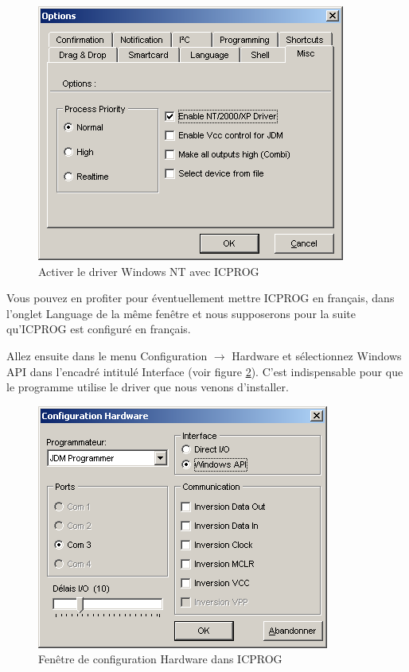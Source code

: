 \documentclass[a4paper]{article}
\begin{document}
\begin{figure}[H]
	\centering
	\includegraphics[scale=0.75]{Images/ICPROG_Enable_NT_Driver.png}
	\caption{Activer le driver Windows NT avec ICPROG
		\label{ICPROG_Enable_NT_Driver}}
\end{figure}

Vous pouvez en profiter pour éventuellement mettre ICPROG en français, dans l'onglet \og{}Language\fg{} de la même fenêtre et nous supposerons pour la suite qu'ICPROG est configuré en français.

Allez ensuite dans le menu \og{}Configuration\fg{} $\rightarrow$ \og{}Hardware\fg{} et sélectionnez \og{}Windows API\fg{} dans l'encadré intitulé \og{}Interface\fg{} (voir figure \ref{ICPROG_Hardware_Settings}). C'est indispensable pour que le programme utilise le driver que nous venons d'installer.

\begin{figure}[H]
	\centering
	\includegraphics[scale=0.75]{Images/ICPROG_Hardware_Settings.png}
	\caption{Fenêtre de configuration Hardware dans ICPROG
		\label{ICPROG_Hardware_Settings}}
\end{figure}
\end{document}
